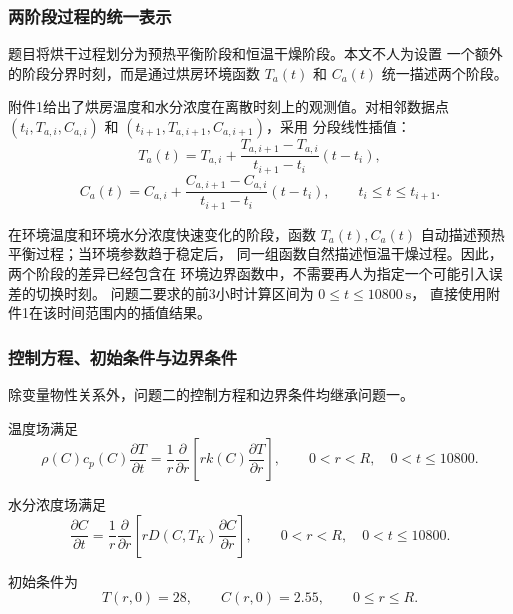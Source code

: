 \documentclass[12pt,a4paper]{article}
\renewcommand{\boxed}[1]{#1}
\begin{document}
\subsubsection{两阶段过程的统一表示}

题目将烘干过程划分为预热平衡阶段和恒温干燥阶段。本文不人为设置
一个额外的阶段分界时刻，而是通过烘房环境函数 $T_a(t)$ 和 $C_a(t)$
统一描述两个阶段。

附件1给出了烘房温度和水分浓度在离散时刻上的观测值。对相邻数据点
$(t_i,T_{a,i},C_{a,i})$ 和 $(t_{i+1},T_{a,i+1},C_{a,i+1})$，采用
分段线性插值：
\begin{equation}
T_a(t)
=
T_{a,i}
+
\frac{T_{a,i+1}-T_{a,i}}{t_{i+1}-t_i}
(t-t_i),
\end{equation}
\begin{equation}
C_a(t)
=
C_{a,i}
+
\frac{C_{a,i+1}-C_{a,i}}{t_{i+1}-t_i}
(t-t_i),
\qquad
t_i\leq t\leq t_{i+1}.
\end{equation}

在环境温度和环境水分浓度快速变化的阶段，函数
$T_a(t),C_a(t)$ 自动描述预热平衡过程；当环境参数趋于稳定后，
同一组函数自然描述恒温干燥过程。因此，两个阶段的差异已经包含在
环境边界函数中，不需要再人为指定一个可能引入误差的切换时刻。
问题二要求的前3小时计算区间为 $0\leq t\leq10800\ \mathrm{s}$，
直接使用附件1在该时间范围内的插值结果。

\subsubsection{控制方程、初始条件与边界条件}

除变量物性关系外，问题二的控制方程和边界条件均继承问题一。

温度场满足
\begin{equation}
\boxed{
\rho(C)c_p(C)\frac{\partial T}{\partial t}
=
\frac{1}{r}
\frac{\partial}{\partial r}
\left[
r k(C)\frac{\partial T}{\partial r}
\right]
},
\qquad
0<r<R,\quad 0<t\leq10800.
\end{equation}

水分浓度场满足
\begin{equation}
\boxed{
\frac{\partial C}{\partial t}
=
\frac{1}{r}
\frac{\partial}{\partial r}
\left[
rD(C,T_K)\frac{\partial C}{\partial r}
\right]
},
\qquad
0<r<R,\quad 0<t\leq10800.
\end{equation}

初始条件为
\begin{equation}
\boxed{
T(r,0)=28,\qquad C(r,0)=2.55
},
\qquad
0\leq r\leq R.
\end{equation}
\end{document}
